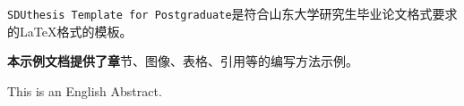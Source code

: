 \begin{cnabstract}

\verb|SDUthesis Template for Postgraduate|是符合山东大学研究生毕业论文格式要求的\LaTeX{}格式的模板。

\textbf{本示例文档提供了章}节、图像、表格、引用等的编写方法示例。


\end{cnabstract}

\begin{enabstract}

This is an English Abstract.


\end{enabstract}
